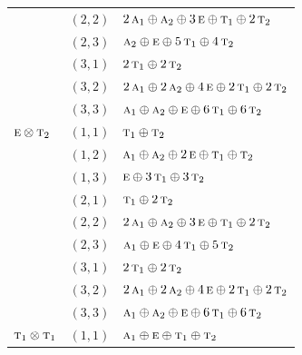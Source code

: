 \documentclass[11pt]{article}
\newcommand{\irr}[1]{\text{\normalfont\scshape #1}}
\begin{document}
\begin{longtable}{p{} c p{}}
 & $(2,2)$ & $2\,\irr{a}_{1}\oplus \irr{a}_{2}\oplus 3\,\irr{e}\oplus \irr{t}_{1}\oplus 2\,\irr{t}_{2}$\\

 & $(2,3)$ & $\irr{a}_{2}\oplus \irr{e}\oplus 5\,\irr{t}_{1}\oplus 4\,\irr{t}_{2}$\\

 & $(3,1)$ & $2\,\irr{t}_{1}\oplus 2\,\irr{t}_{2}$\\

 & $(3,2)$ & $2\,\irr{a}_{1}\oplus 2\,\irr{a}_{2}\oplus 4\,\irr{e}\oplus 2\,\irr{t}_{1}\oplus 2\,\irr{t}_{2}$\\

 & $(3,3)$ & $\irr{a}_{1}\oplus \irr{a}_{2}\oplus \irr{e}\oplus 6\,\irr{t}_{1}\oplus 6\,\irr{t}_{2}$\\

\hline

$\irr{e}\otimes \irr{t}_{2}$ & $(1,1)$ & $\irr{t}_{1}\oplus \irr{t}_{2}$\\

 & $(1,2)$ & $\irr{a}_{1}\oplus \irr{a}_{2}\oplus 2\,\irr{e}\oplus \irr{t}_{1}\oplus \irr{t}_{2}$\\

 & $(1,3)$ & $\irr{e}\oplus 3\,\irr{t}_{1}\oplus 3\,\irr{t}_{2}$\\

 & $(2,1)$ & $\irr{t}_{1}\oplus 2\,\irr{t}_{2}$\\

 & $(2,2)$ & $2\,\irr{a}_{1}\oplus \irr{a}_{2}\oplus 3\,\irr{e}\oplus \irr{t}_{1}\oplus 2\,\irr{t}_{2}$\\

 & $(2,3)$ & $\irr{a}_{1}\oplus \irr{e}\oplus 4\,\irr{t}_{1}\oplus 5\,\irr{t}_{2}$\\

 & $(3,1)$ & $2\,\irr{t}_{1}\oplus 2\,\irr{t}_{2}$\\

 & $(3,2)$ & $2\,\irr{a}_{1}\oplus 2\,\irr{a}_{2}\oplus 4\,\irr{e}\oplus 2\,\irr{t}_{1}\oplus 2\,\irr{t}_{2}$\\

 & $(3,3)$ & $\irr{a}_{1}\oplus \irr{a}_{2}\oplus \irr{e}\oplus 6\,\irr{t}_{1}\oplus 6\,\irr{t}_{2}$\\

\hline

$\irr{t}_{1}\otimes \irr{t}_{1}$ & $(1,1)$ & $\irr{a}_{1}\oplus \irr{e}\oplus \irr{t}_{1}\oplus \irr{t}_{2}$\\


\end{longtable}
\end{document}
